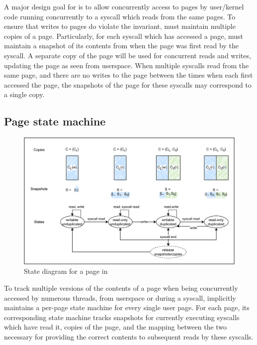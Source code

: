 \documentclass[letterpaper,twocolumn,10pt, anonymous]{article}
\begin{document}
A major design goal for \tiktok is to allow concurrently access to pages
by user/kernel code running concurrently to a syscall which reads from 
the same pages.
To ensure that writes to pages do violate the invariant, \tiktok
must maintain multiple copies of a page.
Particularly, for each syscall which has accessed a page, \tiktok
must maintain a snapshot of its contents from when the page was first 
read by the syscall.
A separate copy of the page will be used for concurrent reads and writes,
updating the page as seen from userspace.
When multiple syscalls read from the same page, and there are no writes
to the page between the times when each first accessed the page, 
the snapshots of the page for these syscalls may correspond to a 
single copy.

\subsection{Page state machine}

\begin{figure}[]
  \includegraphics[width=\linewidth]{img/tiktok_states.pdf}
  \caption{State diagram for a page in \tiktok}
  \label{fig:tiktok_states}
\end{figure}

To track multiple versions of the contents of a page when being concurrently 
accessed by numerous threads, from userspace or during a syscall,
\tiktok implicitly maintains a per-page state machine for every single 
user page.
For each page, its corresponding state machine tracks snapshots for currently 
executing syscalls which have read it, copies of the page, and the mapping 
between the two necessary for providing the correct contents to subsequent reads 
by these syscalls.
\end{document}
